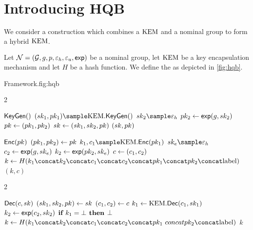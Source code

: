\documentclass{article}
\begin{document}
    \section{Introducing HQB}\label{sec:hqb}

    We consider a construction which combines a $\text{KEM}$ and a nominal group to form a hybrid $\text{KEM}$.


    \begin{definition}[\hqb] \label{def:hqb}

        Let $\mathcal{N} = (\mathcal{G}, g, p, \varepsilon_h , \varepsilon_u , \textsf{exp})$ be a nominal group, let $\text{KEM}$ be a key encapsulation mechanism and let $H$ be a hash function.
        We define the \hqb \kem as depicted in \autoref{fig:hqb}.

        \begin{gamefigure}{\hqb Framework.}{fig:hqb}
            \begin{games}{2}
                \begin{gameenv}{\algor $\textsf{KeyGen}()$}
                    \State $(\sk_1, \pk_1)  \sample \kem.\keygen()$
                    \State $\sk_2 \sample \honestexponent$
                    \State $pk_2 \leftarrow \textsf{exp}(g, sk_2)$
                    \State $pk \leftarrow (pk_1, pk_2)$
                    \State $sk \leftarrow (sk_1, sk_2, pk)$
                    \State \Return $(sk, pk)$
                \end{gameenv}
                \columnbreak
                \begin{gameenv}{\algor $\textsf{Enc}(pk)$}
                    \State $(pk_1, pk_2) \leftarrow pk$
                    \State $k_1, c_1 \sample \kem.\enc(\pk_1)$
                    \State $\sk_e \sample \honestexponent$
                    \State $c_2 \leftarrow \textsf{exp}(g, sk_e)$
                    \State $k_2 \leftarrow \textsf{exp}(pk_2, sk_e)$
                    \State $c \leftarrow (c_1, c_2)$
                    \State $k \assign H(k_1 \concat k_2 \concat c_1 \concat c_2 \concat \pk_1 \concat \pk_2 \concat \text{label})$
                    \State \Return $(k, c)$
                \end{gameenv}
            \end{games}

            \begin{games}{2}
                \begin{gameenv}{\algor $\textsf{Dec}(c, sk)$}
                    \State $(sk_1, sk_2, pk) \leftarrow sk$
                    \State $(c_1, c_2) \leftarrow c$
                    \State $k_1 \leftarrow \text{KEM}.\textsf{Dec}(c_1, sk_1)$
                    \State $k_2 \leftarrow \textsf{exp}(c_2, sk_2)$
                    \State $\textbf{if } k_1 = \bot \textbf{ then}$
                        \State \quad \Return $\bot$
                        \State $k \assign H(k_1 \concat k_2 \concat c_1 \concat c_2 \concat \pk_1 \ concat \pk_2 \concat \text{label})$
                        \State \Return $k$
                    \end{gameenv}
                    \gamebreak
                    \emptygame
                \end{games}
            \end{gamefigure}

        \end{definition}
\end{document}
